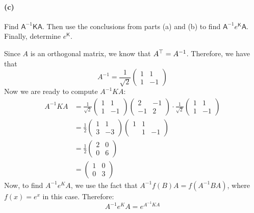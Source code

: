 \documentclass{article}
\begin{document}
\paragraph{(c)}
Find $\mathsf{A}^{-1}\mathsf{K}\mathsf{A}$.  Then use the conclusions from parts (a) and (b) to find $\mathsf{A}^{-1}e^{\mathsf{K}}\mathsf{A}$.  Finally, determine
$e^{\mathsf{K}}$.\\

\begin{solution}
	Since $A$ is an orthogonal matrix, we know that $A^\top = A^{-1}$. Therefore, we have that 
	\[
		A^{-1} = \frac{1}{\sqrt{2} }\begin{pmatrix} 1 & 1\\ 1& -1 \end{pmatrix} 
	\] 
	Now we are ready to compute $A^{-1}KA$:
	\begin{align*}
		A^{-1} KA &= \frac{1}{\sqrt{2}}\begin{pmatrix} 1 & 1 \\ 1& -1 \end{pmatrix} 
		\begin{pmatrix} 2 & -1\\ -1 & 2 \end{pmatrix} 
		\cdot \frac{1}{\sqrt{2} }\begin{pmatrix} 1 & 1 \\1 & -1 \end{pmatrix} \\
		&= \frac{1}{2}\begin{pmatrix} 1 & 1\\3& -3 \end{pmatrix} 
		\begin{pmatrix} 1 & 1\\&1 &-1 \end{pmatrix}  \\
						  &= \frac{1}{2}\begin{pmatrix} 2 & 0\\ 0 & 6 \end{pmatrix}  \\
						  &= \begin{pmatrix} 1 & 0\\0 & 3 \end{pmatrix}
	\end{align*}
	Now, to find $A^{-1}e^KA$, we use the fact that $A^{-1}f(B)A = f(A^{-1}BA)$, where $f(x) = e^x$ in this case.
	Therefore:
	\[
		A^{-1}e^KA = e^{A^{-1}KA}
\]
\end{solution}
\end{document}
